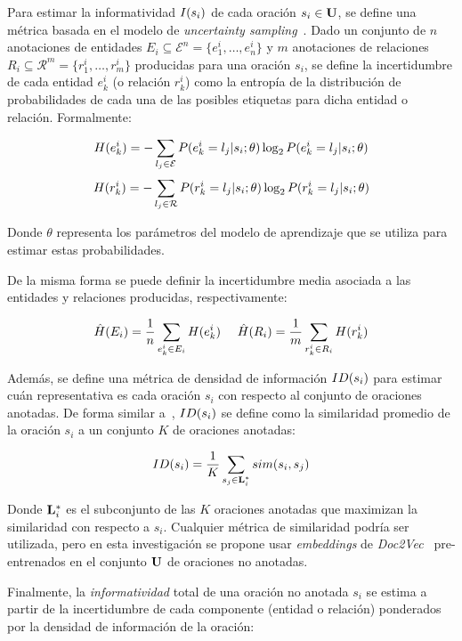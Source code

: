 Para estimar la informatividad $I(s_i)$ de cada oración $s_i \in \mathbf{U}$, se define una métrica basada en el modelo de \textit{uncertainty sampling}~\cite{settles2008analysis}.
Dado un conjunto de $n$ anotaciones de entidades $E_i \subseteq \mathcal{E}^n = \{ e^i_1, \ldots, e^i_n \}$ y $m$ anotaciones de relaciones $R_i \subseteq \mathcal{R}^m = \{ r^i_1, \ldots, r^i_m \}$ producidas para una oración $s_i$, se define la incertidumbre de cada entidad $e^i_k$ (o relación $r^i_k$) como la entropía de la distribución de probabilidades de cada una de las posibles etiquetas para dicha entidad o relación. Formalmente:

\small
$$
H(e^i_k) = -\sum_{l_j \in \mathcal{E}} P(e^i_k=l_j | s_i;\theta) \log_2 P(e^i_k=l_j | s_i;\theta)
$$
$$
H(r^i_k) = -\sum_{l_j \in \mathcal{R}} P(r^i_k=l_j | s_i;\theta) \log_2 P(r^i_k=l_j | s_i;\theta)
$$
\normalsize

\noindent
Donde $\theta$ representa los parámetros del modelo de aprendizaje que se utiliza para estimar estas probabilidades.

De la misma forma se puede definir la incertidumbre media asociada a las entidades y relaciones producidas, respectivamente:

\small
$$
\hat{H}(E_i) = \frac{1}{n} \sum_{e^i_k \in E_i} H(e^i_k) \,\,\,\,\,\,\,\, \hat{H}(R_i) = \frac{1}{m} \sum_{r^i_k \in R_i} H(r^i_k)
$$
\normalsize

Además, se define una métrica de densidad de información $ID(s_i)$ para estimar cuán representativa es cada oración $s_i$
con respecto al conjunto de oraciones anotadas. De forma similar a~\citet{settles2008analysis},
$ID(s_i)$ se define como la similaridad promedio de la oración $s_i$ a un conjunto $K$ de oraciones anotadas:

\small
$$
ID(s_i) = \frac{1}{K} \sum_{s_j \in \mathbf{L}_i^*} sim(s_i, s_j)
$$
\normalsize

\noindent Donde $\mathbf{L}_i^*$ es el subconjunto de las $K$ oraciones anotadas que maximizan la similaridad con respecto a $s_i$. Cualquier métrica de similaridad podría ser utilizada, pero en esta investigación se propone usar \textit{embeddings} de \textit{Doc2Vec}~\cite{doc2vectgensim}
pre-entrenados en el conjunto $\mathbf{U}$ de oraciones no anotadas.

Finalmente, la \textit{informatividad} total de una oración no anotada $s_i$ se estima a partir de la incertidumbre de cada componente (entidad o relación) ponderados por la densidad de información de la oración:

